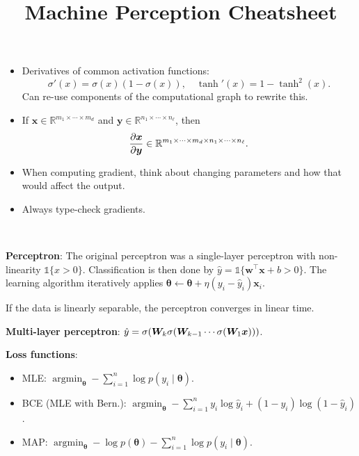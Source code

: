 \documentclass{article}
\title{Machine Perception Cheatsheet}
\DeclareMathOperator*{\argmin}{argmin}
\newcommand{\lft}{\mathopen{}\mathclose\bgroup\left}
\newcommand{\rgt}{\aftergroup\egroup\right}
\newcommand{\R}{\mathbb{R}}
\renewcommand{\vec}[1]{\bm{#1}}
\newcommand{\mat}[1]{\bm{#1}}
\newenvironment{topic}[1]
{\textbf{\sffamily \colorbox{black}{\rlap{\textbf{\textcolor{white}{#1}}}\hspace{\linewidth}\hspace{-2\fboxsep}}} \\ \vspace{0.2cm}}
{}
\begin{document}
\setlength{\columnsep}{0.15cm}


\begin{multicols*}{2}

    \begin{itemize}
        \item Derivatives of common activation functions: \[
                  \sigma'(x) = \sigma(x) (1 - \sigma(x)), \quad \tanh'(x) = 1 - \tanh^2(x).
              \]
              Can re-use components of the computational graph to rewrite this.

        \item If $\vec{x} \in \R^{m_1 \times \cdots \times m_d}$ and $\vec{y} \in \R^{n_1 \times \cdots \times
                      n_\ell}$, then \[
                  \pdv{\vec{x}}{\vec{y}} \in \R^{m_1 \times \cdots \times m_d \times n_1 \times \cdots \times n_\ell}.
              \]
        \item When computing gradient, think about changing parameters and how that would affect the output.
        \item Always type-check gradients.
    \end{itemize}


    \begin{topic}{Neural networks}

        \textbf{Perceptron}: The original perceptron was a single-layer perceptron with non-linearity
        $\mathds{1}\{ x > 0 \}$. Classification is then done by $\hat{y} = \mathds{1}\{ \vec{w}^\top
            \vec{x} + b > 0 \}$. The learning algorithm iteratively applies $\vec{\theta} \gets
            \vec{\theta} + \eta(y_i - \hat{y}_i) \vec{x}_i$. %

        If the data is linearly separable, the perceptron converges in linear time.

        \textbf{Multi-layer perceptron}: $\hat{y} = \sigma \lft( \mat{W}_k \sigma( \mat{W}_{k-1} \cdots \sigma( \mat{W}_1 \vec{x} ) ) \rgt)$.

        \textbf{Loss functions}:
        \begin{itemize}
            \item MLE: $\argmin_{\vec{\theta}} - \sum_{i=1}^{n} \log p(y_i \mid \vec{\theta})$.
            \item BCE (MLE with Bern.): $\argmin_{\vec{\theta}} - \sum_{i=1}^{n} y_i \log \hat{y}_i + (1-y_i) \log (1
                      - \hat{y}_i)$.
            \item MAP: $\argmin_{\vec{\theta}} - \log p(\vec{\theta}) - \sum_{i=1}^{n} \log p(y_i \mid
                      \vec{\theta})$.
        \end{itemize}


\end{topic}
\end{multicols*}
\end{document}
